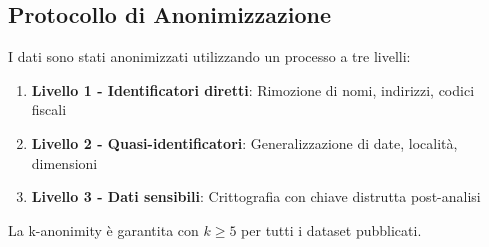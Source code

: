 \subsection{\texorpdfstring{Protocollo di Anonimizzazione}{A.4.2 - Protocollo di Anonimizzazione}}

I dati sono stati anonimizzati utilizzando un processo a tre livelli:

\begin{enumerate}
    \item \textbf{Livello 1 - Identificatori diretti}: Rimozione di nomi, indirizzi, codici fiscali
    \item \textbf{Livello 2 - Quasi-identificatori}: Generalizzazione di date, località, dimensioni
    \item \textbf{Livello 3 - Dati sensibili}: Crittografia con chiave distrutta post-analisi
\end{enumerate}

La k-anonimity è garantita con $k \geq 5$ per tutti i dataset pubblicati.




%
